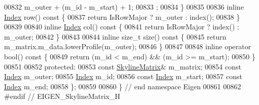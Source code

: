 \begin{DoxyCode}
00832                 m\_outer + (m\_id - m\_start) + 1;
00833         ;
00834     \}
00835 
00836     \textcolor{keyword}{inline} \hyperlink{group___core___module_a554f30542cc2316add4b1ea0a492ff02}{Index} row()\textcolor{keyword}{ const }\{
00837         \textcolor{keywordflow}{return} IsRowMajor ? m\_outer : index();
00838     \}
00839 
00840     \textcolor{keyword}{inline} \hyperlink{group___core___module_a554f30542cc2316add4b1ea0a492ff02}{Index} col()\textcolor{keyword}{ const }\{
00841         \textcolor{keywordflow}{return} IsRowMajor ? index() : m\_outer;
00842     \}
00843 
00844     \textcolor{keyword}{inline} \textcolor{keywordtype}{size\_t} size()\textcolor{keyword}{ const }\{
00845         \textcolor{keywordflow}{return} m\_matrix.m\_data.lowerProfile(m\_outer);
00846     \}
00847 
00848     \textcolor{keyword}{inline} \textcolor{keyword}{operator} bool()\textcolor{keyword}{ const }\{
00849         \textcolor{keywordflow}{return} (m\_id < m\_end) && (m\_id >= m\_start);
00850     \}
00851 
00852 \textcolor{keyword}{protected}:
00853     \textcolor{keyword}{const} \hyperlink{class_eigen_1_1_skyline_matrix}{SkylineMatrix}& m\_matrix;
00854     \textcolor{keyword}{const} \hyperlink{group___core___module_a554f30542cc2316add4b1ea0a492ff02}{Index} m\_outer;
00855     \hyperlink{group___core___module_a554f30542cc2316add4b1ea0a492ff02}{Index} m\_id;
00856     \textcolor{keyword}{const} \hyperlink{group___core___module_a554f30542cc2316add4b1ea0a492ff02}{Index} m\_start;
00857     \textcolor{keyword}{const} \hyperlink{group___core___module_a554f30542cc2316add4b1ea0a492ff02}{Index} m\_end;
00858 \};
00859 
00860 \} \textcolor{comment}{// end namespace Eigen}
00861 
00862 \textcolor{preprocessor}{#endif // EIGEN\_SkylineMatrix\_H}
\end{DoxyCode}
